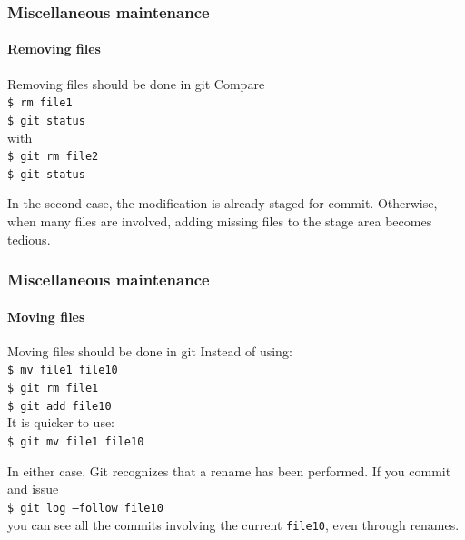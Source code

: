 \begin{frame}
\frametitle{Miscellaneous maintenance}
\framesubtitle{Removing files}

\begin{block}{Removing files should be done in git}
Compare \\
\texttt{\$ rm file1} \\
\texttt{\$ git status} \\
with \\
\texttt{\$ git rm file2} \\
\texttt{\$ git status} 

\medskip
In the second case, the modification is already staged for commit. Otherwise, when many files are involved, adding missing files to the stage area becomes tedious.
\end{block}

\end{frame}

\begin{frame}
\frametitle{Miscellaneous maintenance}
\framesubtitle{Moving files}

\begin{block}{Moving files should be done in git}
Instead of using: \\
\texttt{\$ mv file1 file10} \\
\texttt{\$ git rm file1} \\
\texttt{\$ git add file10} \\
It is quicker to use: \\
\texttt{\$ git mv file1 file10}

\medskip
In either case, Git recognizes that a rename has been performed. If you commit and issue \\
\texttt{\$ git log ---follow file10} \\
you can see all the commits involving the current \texttt{file10}, even through renames.
\end{block}

\end{frame}

